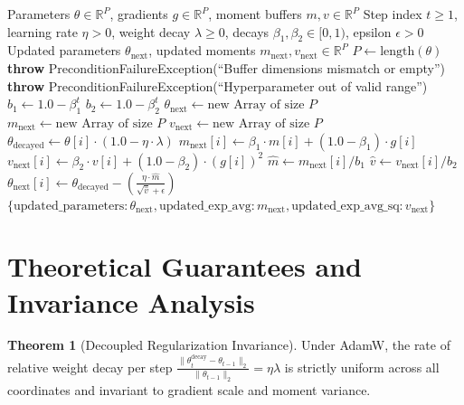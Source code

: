 \documentclass[11pt,a4paper]{article}
\theoremstyle{definition}
\newtheorem{theorem}{Theorem}[section]
\begin{document}
\begin{algorithm}[H]
\caption{Decoupled Weight Decay Adam (AdamW) Step Update}
\begin{algorithmic}[1]
\Require Parameters $\theta \in \mathbb{R}^P$, gradients $g \in \mathbb{R}^P$, moment buffers $m, v \in \mathbb{R}^P$
\Require Step index $t \ge 1$, learning rate $\eta > 0$, weight decay $\lambda \ge 0$, decays $\beta_1, \beta_2 \in [0, 1)$, epsilon $\epsilon > 0$
\Ensure Updated parameters $\theta_{\text{next}}$, updated moments $m_{\text{next}}, v_{\text{next}} \in \mathbb{R}^P$
\State $P \gets \text{length}(\theta)$
    \State \textbf{throw} PreconditionFailureException(``Buffer dimensions mismatch or empty'')
\EndIf
{}
    \State \textbf{throw} PreconditionFailureException(``Hyperparameter out of valid range'')
\EndIf
\State $b_1 \gets 1.0 - \beta_1^t$
\State $b_2 \gets 1.0 - \beta_2^t$
\State $\theta_{\text{next}} \gets \text{new Array of size } P$
\State $m_{\text{next}} \gets \text{new Array of size } P$
\State $v_{\text{next}} \gets \text{new Array of size } P$
    \State $\theta_{\text{decayed}} \gets \theta[i] \cdot (1.0 - \eta \cdot \lambda)$
    \State $m_{\text{next}}[i] \gets \beta_1 \cdot m[i] + (1.0 - \beta_1) \cdot g[i]$
    \State $v_{\text{next}}[i] \gets \beta_2 \cdot v[i] + (1.0 - \beta_2) \cdot (g[i])^2$
    \State $\hat{m} \gets m_{\text{next}}[i] / b_1$
    \State $\hat{v} \gets v_{\text{next}}[i] / b_2$
    \State $\theta_{\text{next}}[i] \gets \theta_{\text{decayed}} - \left(\frac{\eta \cdot \hat{m}}{\sqrt{\hat{v}} + \epsilon}\right)$
\EndFor
\State \Return $\{\text{updated\_parameters}: \theta_{\text{next}}, \text{updated\_exp\_avg}: m_{\text{next}}, \text{updated\_exp\_avg\_sq}: v_{\text{next}}\}$
\end{algorithmic}
\end{algorithm}

\section{Theoretical Guarantees and Invariance Analysis}

\begin{theorem}[Decoupled Regularization Invariance]
Under AdamW, the rate of relative weight decay per step $\frac{\|\theta_t^{\text{decay}} - \theta_{t-1}\|_2}{\|\theta_{t-1}\|_2} = \eta \lambda$ is strictly uniform across all coordinates and invariant to gradient scale and moment variance.
\end{theorem}
\end{document}
